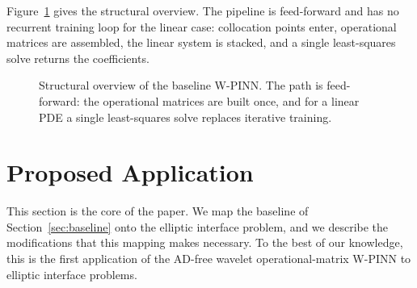 \documentclass[preprint,12pt,authoryear]{elsarticle}
\begin{document}
Figure~\ref{fig:baseline-block} gives the structural overview. The pipeline is feed-forward and has no recurrent training loop for the linear case: collocation points enter, operational matrices are assembled, the linear system is stacked, and a single least-squares solve returns the coefficients.

\begin{figure}[t]
\centering
{}
\caption{Structural overview of the baseline W-PINN. The path is feed-forward: the operational matrices are built once, and for a linear PDE a single least-squares solve replaces iterative training.}
\label{fig:baseline-block}
\end{figure}

\section{Proposed Application}
\label{sec:proposed}

This section is the core of the paper. We map the baseline of Section~\ref{sec:baseline} onto the elliptic interface problem, and we describe the modifications that this mapping makes necessary. To the best of our knowledge, this is the first application of the AD-free wavelet operational-matrix W-PINN to elliptic interface problems.
\end{document}
